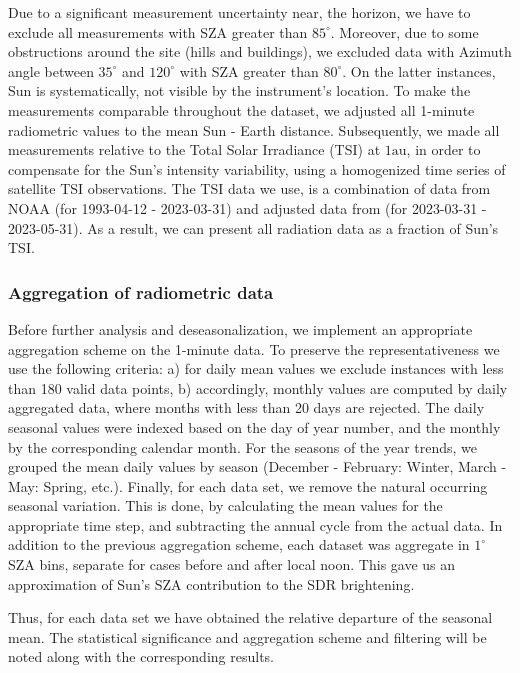 \documentclass[preprint, 3p,
authoryear]{elsarticle} %
\begin{document}
Due to a significant measurement uncertainty near, the horizon, we have
to exclude all measurements with SZA greater than \(85^\circ\).
Moreover, due to some obstructions around the site (hills and
buildings), we excluded data with Azimuth angle between \(35^\circ\) and
\(120^\circ\) with SZA greater than \(80^\circ\). On the latter
instances, Sun is systematically, not visible by the instrument's
location. To make the measurements comparable throughout the dataset, we
adjusted all 1-minute radiometric values to the mean Sun - Earth
distance. Subsequently, we made all measurements relative to the Total
Solar Irradiance (TSI) at \(1 \text{au}\), in order to compensate for
the Sun's intensity variability, using a homogenized time series of
satellite TSI observations. The TSI data we use, is a combination of
data from NOAA \citep{Coddington2005} (for 1993-04-12 - 2023-03-31) and
adjusted data from \citet{TSIStsi} (for 2023-03-31 - 2023-05-31). As a
result, we can present all radiation data as a fraction of Sun's TSI.

\hypertarget{aggregation-of-radiometric-data}{%
\subsubsection{Aggregation of radiometric
data}\label{aggregation-of-radiometric-data}}

Before further analysis and deseasonalization, we implement an
appropriate aggregation scheme on the 1-minute data. To preserve the
representativeness we use the following criteria: a) for daily mean
values we exclude instances with less than 180 valid data points, b)
accordingly, monthly values are computed by daily aggregated data, where
months with less than 20 days are rejected. The daily seasonal values
were indexed based on the day of year number, and the monthly by the
corresponding calendar month. For the seasons of the year trends, we
grouped the mean daily values by season (December - February: Winter,
March - May: Spring, etc.). Finally, for each data set, we remove the
natural occurring seasonal variation. This is done, by calculating the
mean values for the appropriate time step, and subtracting the annual
cycle from the actual data. In addition to the previous aggregation
scheme, each dataset was aggregate in \(1^\circ\) SZA bins, separate for
cases before and after local noon. This gave us an approximation of
Sun's SZA contribution to the SDR brightening.

Thus, for each data set we have obtained the relative departure of the
seasonal mean. The statistical significance and aggregation scheme and
filtering will be noted along with the corresponding results.
\end{document}
